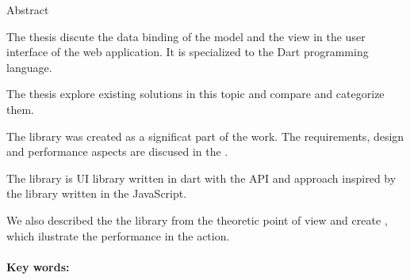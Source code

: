 
\noindent
\begin{center}
\begin{minipage}{1\textwidth}
\centerline{\large Abstract}
\setlength{\parskip}{0.2cm}
The thesis discute the data binding of the model and the view in the user interface of the web application.
It is specialized to the Dart programming language. 

The thesis explore existing solutions in this topic and compare and categorize them.

The \tiles library was created as a significat part of the work. 
The requirements, design and performance aspects are discused in the . 

The \tiles library is  UI library written in dart 
with the API and approach inspired by the \facebook {} library written in the JavaScript.

We also described the  the library from the theoretic point of view 
and create , which ilustrate the performance in the action.
\\ \\ 
{\bf Key words:} \mfkeywordsen
\end{minipage}
\end{center}
\eject %


